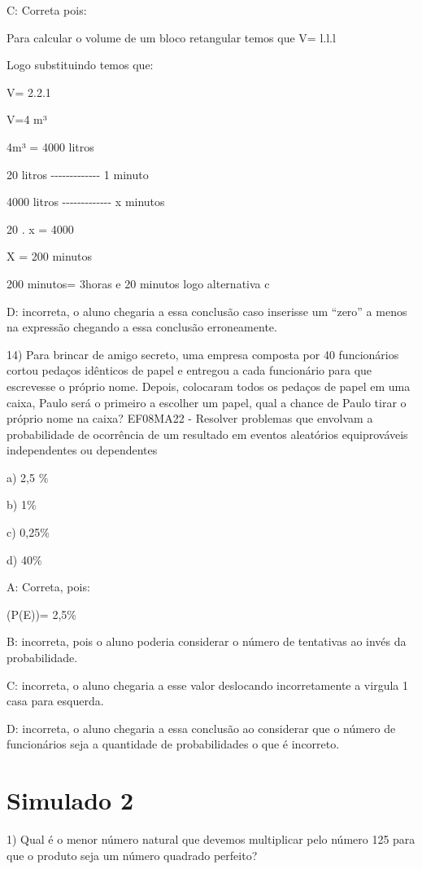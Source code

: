 C: Correta pois:

Para calcular o volume de um bloco retangular temos que V= l.l.l

Logo substituindo temos que:

V= 2.2.1

V=4 m³

4m³ = 4000 litros

20 litros -\/-\/-\/-\/-\/-\/-\/-\/-\/-\/-\/-\/- 1 minuto

4000 litros -\/-\/-\/-\/-\/-\/-\/-\/-\/-\/-\/-\/- x minutos

20 . x = 4000

X = 200 minutos

200 minutos= 3horas e 20 minutos logo alternativa c

D: incorreta, o aluno chegaria a essa conclusão caso inserisse um
``zero'' a menos na expressão chegando a essa conclusão erroneamente.

14) Para brincar de amigo secreto, uma empresa composta por 40
funcionários cortou pedaços idênticos de papel e entregou a cada
funcionário para que escrevesse o próprio nome. Depois, colocaram todos
os pedaços de papel em uma caixa, Paulo será o primeiro a escolher um
papel, qual a chance de Paulo tirar o próprio nome na caixa? EF08MA22 -
Resolver problemas que envolvam a probabilidade de ocorrência de um
resultado em eventos aleatórios equiprováveis independentes ou
dependentes

a) 2,5 \%

b) 1\%

c) 0,25\%

d) 40\%

A: Correta, pois:

(P(E))= 2,5\%

B: incorreta, pois o aluno poderia considerar o número de tentativas ao
invés da probabilidade.

C: incorreta, o aluno chegaria a esse valor deslocando incorretamente a
virgula 1 casa para esquerda.

D: incorreta, o aluno chegaria a essa conclusão ao considerar que o
número de funcionários seja a quantidade de probabilidades o que é
incorreto.

\section{Simulado 2}

1) Qual é o menor número natural que devemos multiplicar pelo número 125
para que o produto seja um número quadrado perfeito?

